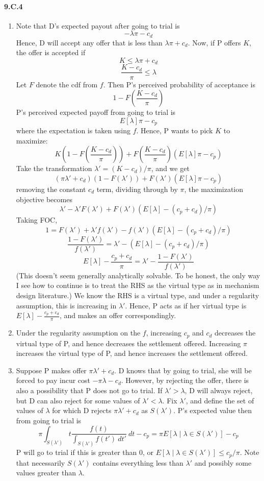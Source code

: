 \documentclass[10pt,letter]{article}
\begin{document}
\paragraph*{9.C.4}
\begin{enumerate}[label=(\alph*)]
  \item Note that D's expected payout after going to trial is
  \[ - \lambda \pi - c_d \]
  Hence, D will accept any offer that is less than $\lambda \pi + c_d$. Now, if P offers $K$, the offer is accepted if
  \[ K \le \lambda \pi + c_d \]
  \[ \frac{K - c_d}{\pi} \le \lambda \]
  Let $F$ denote the cdf from $f$. Then P's perceived probability of acceptance is
  \[ 1 - F\left(\frac{K - c_d}{\pi} \right) \]
  P's perceived expected payoff from going to trial is
  \[ E[\lambda]\pi - c_p \]
  where the expectation is taken using $f$. Hence, P wants to pick $K$ to maximize:
  \[ K\left(1 - F\left(\frac{K - c_d}{\pi} \right)\right) + F\left(\frac{K - c_d}{\pi} \right)(E[\lambda]\pi - c_p) \]
  Take the transformation $\lambda' = (K - c_d)/\pi$, and we get
  \[ (\pi \lambda' + c_d)(1-F(\lambda')) + F(\lambda')(E[\lambda]\pi - c_p) \]
  removing the constant $c_d$ term, dividing through by $\pi$, the maximization objective becomes
  \[ \lambda'-  \lambda'F(\lambda') + F(\lambda')(E[\lambda] - (c_p + c_d)/\pi) \]
  Taking FOC,
  \[ 1 = F(\lambda') + \lambda' f(\lambda') - f(\lambda')(E[\lambda] - (c_p + c_d)/\pi) \]
  \[ \frac{1 - F(\lambda')}{f(\lambda')} =  \lambda' - (E[\lambda] - (c_p + c_d)/\pi) \]
  \[E[\lambda] - \frac{c_p + c_d}{\pi} = \lambda' - \frac{1 - F(\lambda')}{f(\lambda')}  \]
  (This doesn't seem generally analytically solvable. To be honest, the only way I see how to continue is to treat the RHS as the virtual type as in mechanism design literature.) We know the RHS is a virtual type, and under a regularity assumption, this is increasing in $\lambda'$. Hence, P acts as if her virtual type is $E[\lambda] - \frac{c_p + c_d}{\pi}$, and makes an offer correspondingly.
  \item Under the regularity assumption on the $f$, increasing $c_p$ and $c_d$ decreases the virtual type of P, and hence decreases the settlement offered. Increasing $\pi$ increases the virtual type of P, and hence increases the settlement offered.
  \item Suppose P makes offer $\pi \lambda' + c_d$. D knows that by going to trial, she will be forced to pay incur cost $-\pi \lambda - c_d $. However, by rejecting the offer, there is also a possibility that P does not go to trial. If $\lambda' > \lambda$, D will always reject, but D can also reject for some values of $\lambda' < \lambda$. Fix $\lambda'$, and define the set of values of $\lambda$ for which D rejects $\pi \lambda' + c_d$ as $S(\lambda')$. P's expected value then from going to trial is
  \[ \pi \int_{S(\lambda')} t \frac{ f(t) }{\int_{S(\lambda')} f(t') \ dt'} \ dt - c_p = \pi E[\lambda \mid \lambda \in S(\lambda')] - c_p \]
  P will go to trial if this is greater than 0, or $ E[\lambda \mid \lambda \in S(\lambda')] \le c_p / \pi$. Note that necessarily $S(\lambda')$ contains everything less than $\lambda'$ and possibly some values greater than $\lambda$.


\end{enumerate}
\end{document}

